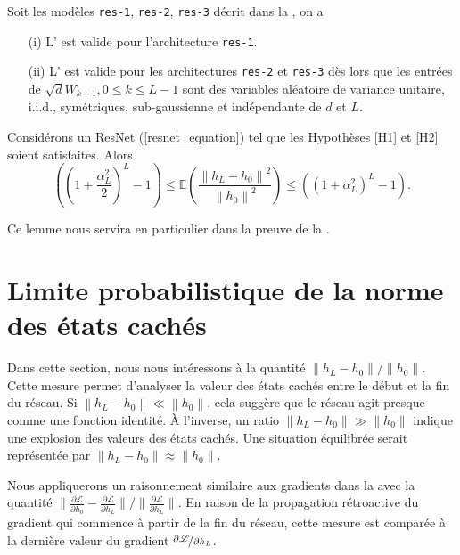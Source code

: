 \begin{proposition}[Admis]\label{prop1}
    Soit les modèles \texttt{res-1}, \texttt{res-2}, \texttt{res-3} décrit dans la , on a \begin{itemize}
        \item [(i)] L' est valide pour l'architecture \texttt{res-1}.
        \item [(ii)] L' est valide pour les architectures \texttt{res-2} et \texttt{res-3} dès lors que les entrées de $ \sqrt{d}W_{k+1}, 0 \leqslant k \leqslant L-1 $ sont des variables aléatoire de variance unitaire, i.i.d., symétriques, sub-gaussienne et indépendante de $ d $ et $ L $.
    \end{itemize}
\end{proposition}

\begin{lem}[Admis]\label{lem14}
    Considérons un ResNet (\ref{resnet_equation}) tel que les Hypothèses \ref{H1} et \ref{H2} soient satisfaites. Alors
    \[
        ((1 + \frac{\alpha _L ^2 }{2 }) ^L - 1) \leqslant \mathbb{E}( \frac{\left\| h_L - h_0 \right\| ^2 }{\left\| h_0 \right\| ^2}) \leqslant ((1 + \alpha _L ^2 ) ^L - 1 )
    .\]
\end{lem}
Ce lemme nous servira en particulier dans la preuve de la .

\section{Limite probabilistique de la norme des états cachés}

Dans cette section, nous nous intéressons à la quantité $ {\left\| h_L - h_0 \right\|} / {\left\| h_0 \right\|}$. Cette mesure permet d'analyser la valeur des états cachés entre le début et la fin du réseau. Si $\left\| h_L - h_0 \right\| \ll \left\| h_0 \right\|$, cela suggère que le réseau agit presque comme une fonction identité. À l'inverse, un ratio $\left\| h_L - h_0 \right\| \gg \left\| h_0 \right\|$ indique une explosion des valeurs des états cachés. Une situation équilibrée serait représentée par $\left\| h_L - h_0 \right\| \approx \left\| h_0 \right\|$.

Nous appliquerons un raisonnement similaire aux gradients dans la  avec la quantité ${\| \frac{\partial \mathscr{L}}{\partial h_0} - \frac{\partial \mathscr{L}}{\partial h_L} \|} / {\| \frac{\partial \mathscr{L}}{\partial h_L} \|}$. En raison de la propagation rétroactive du gradient qui commence à partir de la fin du réseau, cette mesure est comparée à la dernière valeur du gradient $\nicefrac{\partial \mathscr{L}}{\partial h_L}$.

